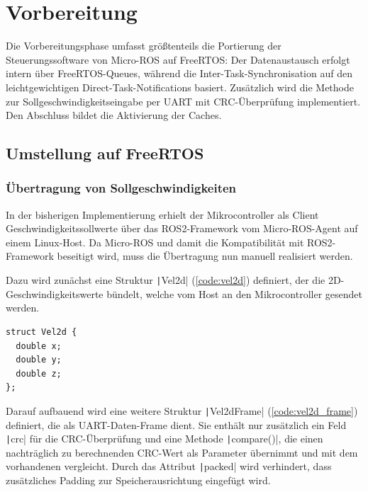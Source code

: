 \section{Vorbereitung}

Die Vorbereitungsphase umfasst größtenteils die Portierung der
Steuerungssoftware von Micro-ROS auf FreeRTOS: Der Datenaustausch erfolgt intern
über FreeRTOS-Queues, während die Inter-Task-Synchronisation auf den
leichtgewichtigen Direct-Task-Notifications basiert. Zusätzlich wird die Methode
zur Sollgeschwindigkeitseingabe per UART mit CRC-Überprüfung implementiert. Den
Abschluss bildet die Aktivierung der Caches.

\subsection{Umstellung auf FreeRTOS}

\subsubsection{Übertragung von Sollgeschwindigkeiten}

In der bisherigen Implementierung erhielt der Mikrocontroller als Client
Geschwindigkeitssollwerte über das ROS2-Framework vom Micro-ROS-Agent auf einem
Linux-Host. Da Micro-ROS und damit die Kompatibilität mit ROS2-Framework
beseitigt wird, muss die Übertragung nun manuell realisiert werden.

Dazu wird zunächst eine Struktur \texttt|Vel2d| (\ref{code:vel2d})
definiert, der die 2D-Geschwindigkeitswerte bündelt, welche vom Host an den
Mikrocontroller gesendet werden.

\begin{code}
\begin{verbatim}
struct Vel2d {
  double x;
  double y;
  double z;
};
\end{verbatim}
    \label{code:vel2d}
\end{code}

Darauf aufbauend wird eine weitere Struktur \texttt|Vel2dFrame|
(\ref{code:vel2d_frame}) definiert, die als UART-Daten-Frame dient. Sie enthält
nur zusätzlich ein Feld \texttt|crc| für die CRC-Überprüfung und eine
Methode \texttt|compare()|, die einen nachträglich zu berechnenden
CRC-Wert als Parameter übernimmt und mit dem vorhandenen vergleicht. Durch das
Attribut \texttt|packed| wird verhindert, dass zusätzliches Padding zur
Speicherausrichtung eingefügt wird.

